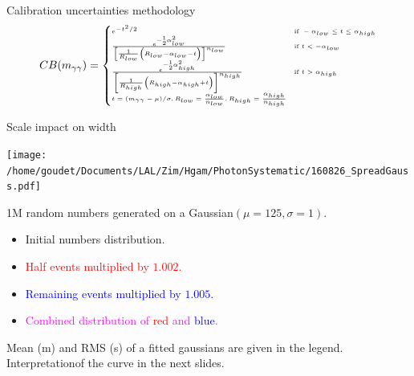 \begin{frame}{Calibration uncertainties methodology}
    \begin{equation}
      \tiny
      CB(m_{\gamma \gamma}) = 
      \begin{cases}
        e^{-t^{2}/2} & \text{if } -\alpha_{low} \leq t \leq \alpha_{high} \\
        \frac{ e^{-{}^{1}_{2} \alpha_{low}^{2}} } { \left[ \frac{1}{R_{low}} \left(R_{low} - \alpha_{low} - t \right) \right]^{n_{low}} } & \text{if } t < -\alpha_{low} \\
        \frac{ e^{-{}^{1}_{2} \alpha_{high}^{2}} } { \left[ \frac{1}{R_{high}} \left(R_{high} - \alpha_{high} + t \right) \right]^{n_{high}} } & \text{if } t > \alpha_{high} \\
        t=(m_{\gamma\gamma}-\mu)/\sigma, R_{low}=\frac{\alpha_{low}}{n_{low}},  R_{high}=\frac{\alpha_{high}}{n_{high}} \\
      \end{cases}
    \end{equation}

\end{frame}
\begin{frame}{Scale impact on width}
  \begin{minipage}{0.49\linewidth}\texttt{[image: /home/goudet/Documents/LAL/Zim/Hgam/PhotonSystematic/160826\_SpreadGauss.pdf]}\end{minipage}
  \hfill
  \begin{minipage}{0.49\linewidth}
    1M random numbers generated on a Gaussian$(\mu=125, \sigma=1)$.
    \begin{itemize}
    \item Initial numbers distribution.
    \item \textcolor{red}{Half events multiplied by $1.002$.}
    \item \textcolor{blue}{Remaining  events multiplied by $1.005$.}
    \item \textcolor{magenta}{Combined distribution of \textcolor{red}{red} and \textcolor{blue}{blue}.}
    \end{itemize}
  \end{minipage}
  \vfill
  Mean (m) and RMS (s) of a fitted gaussians are given in the legend.
  Interpretationof the curve in the next slides.
\end{frame}

